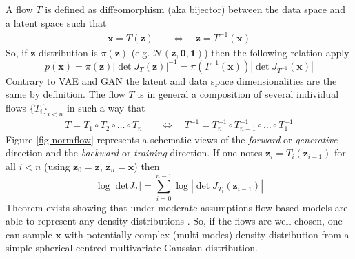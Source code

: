 \documentclass[11pt]{amsart}
\begin{document}
A flow $T$ is defined as diffeomorphism (aka bijector) between the data space and a latent space such that
\begin{align}
\bm{x} = T(\bm{z}) & \quad \Leftrightarrow \quad \bm{z} = T^{-1}(\bm{x})
\end{align}
So, if $\bm{z}$ distribution is $\pi(\bm{z})$ (e.g. $\mathcal{N}(\bm{z},\bm{0},\bm{1})$) then the following relation apply
\begin{equation}
p(\bm{x}) =  \pi(\bm{z})|\det J_T(\bm{z})|^{-1} = \pi(T^{-1}(\bm{x}))|\det J_{T^{-1}}(\bm{x})|
\end{equation}
Contrary to VAE and GAN the latent and data space dimensionalities are the same by definition. The flow $T$ is in general a composition of several individual flows $\{T_i\}_{i<n}$ in such a way that
\begin{align}
T=T_1\circ T_2\circ \dots \circ T_n & \quad \Leftrightarrow \quad 
T^{-1}=T_n^{-1}\circ T_{n-1}^{-1}\circ \dots \circ T_1^{-1}
\end{align}
Figure \ref{fig-normflow} represents a schematic views of the \textit{forward} or \textit{generative} direction and the \textit{backward} or \textit{training} direction. 
If one notes $\bm{z}_i = T_i(\bm{z}_{i-1})$ for all $i<n$  (using $\bm{z}_0=\bm{z}$, $\bm{z}_n=\bm{x}$) then
\begin{equation}
\log |\mathrm{det} J_T| = \sum_{i=0}^{n-1} \log |\det J_{T_i}(\bm{z}_{i-1})|
\label{eq-flow-jacob}
\end{equation}
Theorem exists showing that under moderate assumptions flow-based models are able to represent any density distributions \citep{Bogachev2005,huang2019solving}. So, if the flows are well chosen, one can sample $\bm{x}$ with potentially complex (multi-modes) density distribution from a simple spherical centred multivariate Gaussian distribution.
\end{document}
